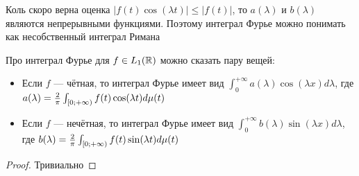 \begin{note}
	Коль скоро верна оценка $|f(t)\cos(\lambda t)| \le |f(t)|$, то $a(\lambda)$ и $b(\lambda)$ являются непрерывными функциями. Поэтому интеграл Фурье можно понимать как несобственный интеграл Римана
\end{note}

\begin{proposition}
	Про интеграл Фурье для $f \in L_1(\mathbb{R})$ можно сказать пару вещей:
	\begin{itemize}
		\item Если $f$ --- чётная, то интеграл  Фурье имеет вид $\int_0^{+\infty} a(\lambda)\cos(\lambda x)d\lambda$, где $a(\lambda) = \frac{2}{\pi} \int_{\left[0; +\infty\right)} f(t)\cos(\lambda t)d\mu(t)$
		
		\item Если $f$ --- нечётная, то интеграл Фурье имеет вид $\int_0^{+\infty} b(\lambda)\sin(\lambda x)d\lambda$, где $b(\lambda) = \frac{2}{\pi} \int_{\left[0; +\infty\right)} f(t)\sin(\lambda t)d\mu(t)$
	\end{itemize}
\end{proposition}

\begin{proof}
	Тривиально
\end{proof}